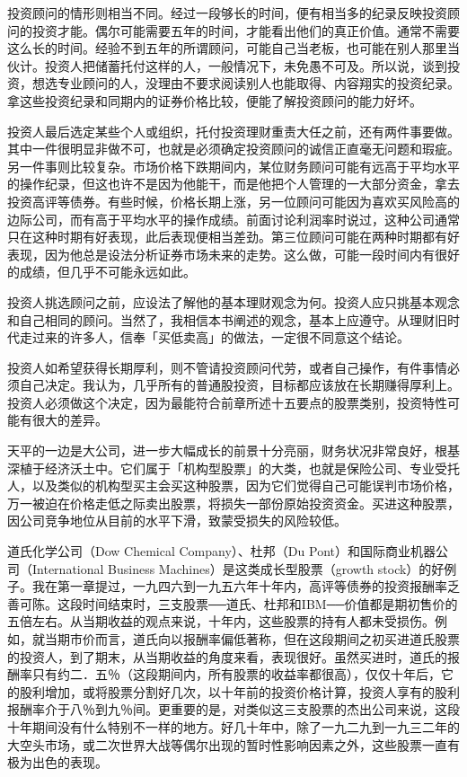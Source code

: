 \documentclass[UTF8,a4paper,zihao=-4,fontset = windows]{ctexart} %
\begin{document}
投资顾问的情形则相当不同。经过一段够长的时间，便有相当多的纪录反映投资顾问的投资才能。偶尔可能需要五年的时间，才能看出他们的真正价值。通常不需要这么长的时间。经验不到五年的所谓顾问，可能自己当老板，也可能在别人那里当伙计。投资人把储蓄托付这样的人，一般情况下，未免愚不可及。所以说，谈到投资，想选专业顾问的人，没理由不要求阅读别人也能取得、内容翔实的投资纪录。拿这些投资纪录和同期内的证券价格比较，便能了解投资顾问的能力好坏。

投资人最后选定某些个人或组织，托付投资理财重责大任之前，还有两件事要做。其中一件很明显非做不可，也就是必须确定投资顾问的诚信正直毫无问题和瑕疵。另一件事则比较复杂。市场价格下跌期间内，某位财务顾问可能有远高于平均水平的操作纪录，但这也许不是因为他能干，而是他把个人管理的一大部分资金，拿去投资高评等债券。有些时候，价格长期上涨，另一位顾问可能因为喜欢买风险高的边际公司，而有高于平均水平的操作成绩。前面讨论利润率时说过，这种公司通常只在这种时期有好表现，此后表现便相当差劲。第三位顾问可能在两种时期都有好表现，因为他总是设法分析证券市场未来的走势。这么做，可能一段时间内有很好的成绩，但几乎不可能永远如此。

投资人挑选顾问之前，应设法了解他的基本理财观念为何。投资人应只挑基本观念和自己相同的顾问。当然了，我相信本书阐述的观念，基本上应遵守。从理财旧时代走过来的许多人，信奉「买低卖高」的做法，一定很不同意这个结论。

投资人如希望获得长期厚利，则不管请投资顾问代劳，或者自己操作，有件事情必须自己决定。我认为，几乎所有的普通股投资，目标都应该放在长期赚得厚利上。投资人必须做这个决定，因为最能符合前章所述十五要点的股票类别，投资特性可能有很大的差异。

天平的一边是大公司，进一步大幅成长的前景十分亮丽，财务状况非常良好，根基深植于经济沃土中。它们属于「机构型股票」的大类，也就是保险公司、专业受托人，以及类似的机构型买主会买这种股票，因为它们觉得自己可能误判市场价格，万一被迫在价格走低之际卖出股票，将损失一部份原始投资资金。买进这种股票，因公司竞争地位从目前的水平下滑，致蒙受损失的风险较低。

道氏化学公司（Dow Chemical Company）、杜邦（Du Pont）和国际商业机器公司（International Business Machines）是这类成长型股票（growth stock）的好例子。我在第一章提过，一九四六到一九五六年十年内，高评等债券的投资报酬率乏善可陈。这段时间结束时，三支股票──道氏、杜邦和IBM──价值都是期初售价的五倍左右。从当期收益的观点来说，十年内，这些股票的持有人都未受损伤。例如，就当期市价而言，道氏向以报酬率偏低著称，但在这段期间之初买进道氏股票的投资人，到了期末，从当期收益的角度来看，表现很好。虽然买进时，道氏的报酬率只有约二．五％（这段期间内，所有股票的收益率都很高），仅仅十年后，它的股利增加，或将股票分割好几次，以十年前的投资价格计算，投资人享有的股利报酬率介于八％到九％间。更重要的是，对类似这三支股票的杰出公司来说，这段十年期间没有什么特别不一样的地方。好几十年中，除了一九二九到一九三二年的大空头市场，或二次世界大战等偶尔出现的暂时性影响因素之外，这些股票一直有极为出色的表现。
\end{document}
